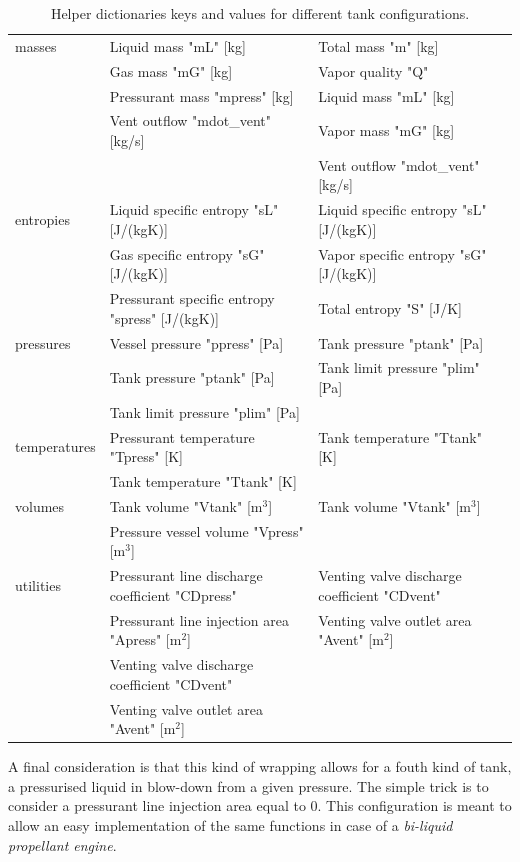 \begin{table}[h!]
{\begin{tabular}{l|l|l}
masses & Liquid mass "mL" [kg] & Total mass "m" [kg]\\
& Gas mass "mG" [kg] & Vapor quality "Q"\\
& Pressurant mass "mpress" [kg] & Liquid mass "mL" [kg]\\
& Vent outflow "mdot\_vent" [kg/s] & Vapor mass "mG" [kg]\\
& & Vent outflow "mdot\_vent" [kg/s]\\
\hline
entropies & Liquid specific entropy "sL" [J/(kgK)] & Liquid specific entropy "sL" [J/(kgK)]\\
& Gas specific entropy "sG" [J/(kgK)] & Vapor specific entropy "sG" [J/(kgK)]\\
& Pressurant specific entropy "spress" [J/(kgK)] & Total entropy "S" [J/K]\\
\hline
pressures & Vessel pressure "ppress" [Pa] & Tank pressure "ptank" [Pa]\\
& Tank pressure "ptank" [Pa] & Tank limit pressure "plim" [Pa]\\
& Tank limit pressure "plim" [Pa] & \\
\hline
temperatures & Pressurant temperature "Tpress" [K] & Tank temperature "Ttank" [K]\\
& Tank temperature "Ttank" [K] & \\
\hline
volumes & Tank volume "Vtank" [m$^3$] & Tank volume "Vtank" [m$^3$]\\
& Pressure vessel volume "Vpress" [m$^3$] & \\
\hline
utilities & Pressurant line discharge coefficient "CDpress" & Venting valve discharge coefficient "CDvent"\\
& Pressurant line injection area "Apress" [m$^2$] & Venting valve outlet area "Avent" [m$^2$]\\
& Venting valve discharge coefficient "CDvent" & \\
& Venting valve outlet area "Avent" [m$^2$] & \\
\hline
\end{tabular}
}
\caption{Helper dictionaries keys and values for different tank configurations.}
\label{Tab: TankDicts}
\end{table}

A final consideration is that this kind of wrapping allows for a fouth kind of tank, a pressurised liquid in blow-down from a given pressure. The simple trick is to consider a pressurant line injection area equal to 0.
This configuration is meant to allow an easy implementation of the same functions in case of a \textit{bi-liquid propellant engine}.
